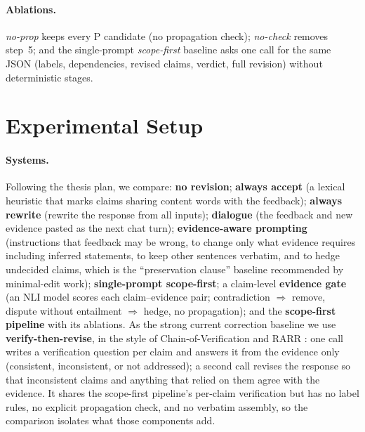 \documentclass[11pt]{article}
\newcommand{\Pp}{\textsc{P}}
\begin{document}
\paragraph{Ablations.} \emph{no-prop} keeps every \Pp{} candidate (no propagation check); \emph{no-check} removes step~5; and the single-prompt \emph{scope-first} baseline asks one call for the same JSON (labels, dependencies, revised claims, verdict, full revision) without deterministic stages.

\section{Experimental Setup}
\label{sec:setup}
\paragraph{Systems.} Following the thesis plan, we compare: \textbf{no revision}; \textbf{always accept} (a lexical heuristic that marks claims sharing content words with the feedback); \textbf{always rewrite} (rewrite the response from all inputs); \textbf{dialogue} (the feedback and new evidence pasted as the next chat turn); \textbf{evidence-aware prompting} (instructions that feedback may be wrong, to change only what evidence requires including inferred statements, to keep other sentences verbatim, and to hedge undecided claims, which is the ``preservation clause'' baseline recommended by minimal-edit work); \textbf{single-prompt scope-first}; a claim-level \textbf{evidence gate} (an NLI model scores each claim--evidence pair; contradiction $\Rightarrow$ remove, dispute without entailment $\Rightarrow$ hedge, no propagation); and the \textbf{scope-first pipeline} with its ablations. As the strong current correction baseline we use \textbf{verify-then-revise}, in the style of Chain-of-Verification and RARR \citep{dhuliawala2024cove,gao2023rarr}: one call writes a verification question per claim and answers it from the evidence only (consistent, inconsistent, or not addressed); a second call revises the response so that inconsistent claims and anything that relied on them agree with the evidence. It shares the scope-first pipeline's per-claim verification but has no label rules, no explicit propagation check, and no verbatim assembly, so the comparison isolates what those components add.
\end{document}
